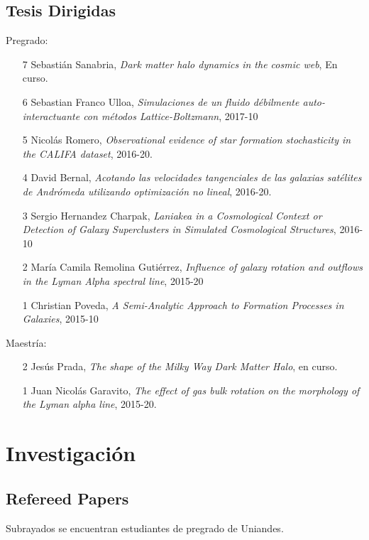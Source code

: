 \documentclass{article}
\begin{document}
\subsection{Tesis Dirigidas}

Pregrado:
\begin{itemize}
\item [7] Sebasti\'an Sanabria, \emph{Dark matter halo dynamics in the
  cosmic web}, En curso.
\item [6] Sebastian Franco Ulloa, \emph{Simulaciones de un fluido
  débilmente auto-interactuante con métodos Lattice-Boltzmann},
  2017-10
\item [5] Nicol\'as Romero, \emph{Observational evidence of star formation
  stochasticity in the CALIFA dataset}, 2016-20.
\item [4] David Bernal, \emph{Acotando las velocidades tangenciales de las
  galaxias satélites de Andrómeda utilizando optimización no lineal}, 2016-20.
\item [3] Sergio Hernandez Charpak, \emph{Laniakea in a Cosmological
  Context or Detection of Galaxy Superclusters in Simulated
  Cosmological Structures}, 2016-10
\item [2] Mar\'ia Camila Remolina Guti\'errez, \emph{Influence of galaxy
  rotation and outflows in the Lyman Alpha spectral line}, 2015-20
\item [1] Christian Poveda, \emph{A Semi-Analytic Approach to Formation
  Processes in Galaxies}, 2015-10
\end{itemize}

Maestr\'ia:
\begin{itemize}
\item [2] Jes\'us Prada, \emph{The shape of the Milky Way Dark Matter
  Halo}, en curso.
\item [1] Juan Nicol\'as Garavito, \emph{The effect of gas bulk rotation
  on the morphology of the Lyman alpha line}, 2015-20.
\end{itemize}

\newpage
\section{Investigaci\'on}

\subsection{Refereed Papers}

Subrayados se encuentran estudiantes de pregrado de Uniandes.
\end{document}
